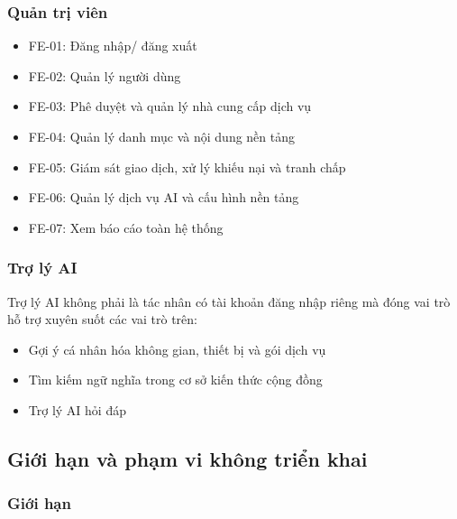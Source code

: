 \subsubsection{Quản trị viên}
\begin{itemize}
	\item FE-01: Đăng nhập/ đăng xuất
	\item FE-02: Quản lý người dùng
	\item FE-03: Phê duyệt và quản lý nhà cung cấp dịch vụ
	\item FE-04: Quản lý danh mục và nội dung nền tảng
	\item FE-05: Giám sát giao dịch, xử lý khiếu nại và tranh chấp
	\item FE-06: Quản lý dịch vụ AI và cấu hình nền tảng
	\item FE-07: Xem báo cáo toàn hệ thống
\end{itemize}

\subsubsection{Trợ lý AI}
Trợ lý AI không phải là tác nhân có tài khoản đăng nhập riêng mà đóng vai trò hỗ trợ xuyên suốt các vai trò trên:
\begin{itemize}
	\item Gợi ý cá nhân hóa không gian, thiết bị và gói dịch vụ
	\item Tìm kiếm ngữ nghĩa trong cơ sở kiến thức cộng đồng
	\item Trợ lý AI hỏi đáp 
\end{itemize}

\subsection{Giới hạn và phạm vi không triển khai}

\subsubsection{Giới hạn}

